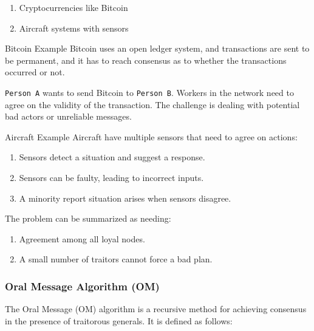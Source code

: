 \begin{enumerate}[noitemsep, topsep=1pt] 
\item Cryptocurrencies like Bitcoin
\item Aircraft systems with sensors
\end{enumerate}

\begin{example}{Bitcoin Example}
Bitcoin uses an open ledger system, and transactions are sent to be permanent, and it has to reach consensus as to whether the transactions occurred or not.

\texttt{Person A} wants to send Bitcoin to \texttt{Person B}.
Workers in the network need to agree on the validity of the transaction.
The challenge is dealing with potential bad actors or unreliable messages.	
\end{example}

\begin{example}{Aircraft Example}
Aircraft have multiple sensors that need to agree on actions:

\begin{enumerate}[noitemsep, topsep=1pt]
\item Sensors detect a situation and suggest a response.
\item Sensors can be faulty, leading to incorrect inputs.
\item A minority report situation arises when sensors disagree.
\end{enumerate}	
\end{example}

The problem can be summarized as needing:
\begin{enumerate}[noitemsep, topsep=1pt]
\item Agreement among all loyal nodes.
\item A small number of traitors cannot force a bad plan.
\end{enumerate}

\subsubsection{Oral Message Algorithm (OM)}
The Oral Message (OM) algorithm is a recursive method for achieving consensus in the presence of traitorous generals. It is defined as follows:

